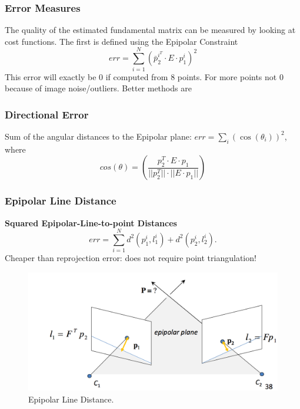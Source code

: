 \documentclass[a4paper,12 pt]{article}
\theoremstyle{definition}
\theoremstyle{remark}
\theoremstyle{definition}
\theoremstyle{definition}
\theoremstyle{definition}
\theoremstyle{remark}
\theoremstyle{definition}
\begin{document}
\subsubsection*{Error Measures}
The quality of the estimated fundamental matrix can be measured by looking at cost functions. The first is defined using the Epipolar Constraint
\begin{equation}
err = \sum_{i=1}^{N}(\bar{p}_2^{i^T}\cdot E \cdot p_1^{i})^2
\end{equation}
This error will exactly be 0 if computed from 8 points. For more points not 0 because of image noise/outliers. Better methods are
\subsubsection*{Directional Error}
Sum of the angular distances to the Epipolar plane: $err=\sum_i (\cos(\theta_i))^2$, where
\begin{equation}
cos(\theta)=\left(\frac{p_2^T\cdot E \cdot p_1}{||p_2^T||\cdot ||E\cdot p_1||} \right)
\end{equation}
\subsubsection*{Epipolar Line Distance}
\textbf{Squared Epipolar-Line-to-point Distances}
\begin{equation}
err=\sum_{i=1}^Nd^2(p_1^i,l_1^i)+d^2(p_2^i,l_2^i).
\end{equation}
Cheaper than reprojection error: does not require point triangulation!
\begin{figure}[h!]
\begin{center}
\includegraphics[scale=0.3]{pics/epi_line}
\caption{Epipolar Line Distance. \label{fig:epi_line}}
\end{center}
\end{figure}
\end{document}
